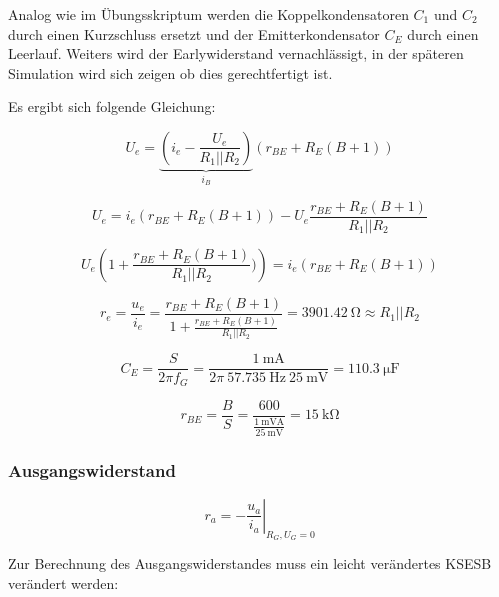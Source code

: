 Analog wie im Übungsskriptum werden die Koppelkondensatoren $C_1$ und $C_2$ durch einen Kurzschluss ersetzt und der Emitterkondensator $C_E$ durch einen Leerlauf. Weiters wird der Earlywiderstand vernachlässigt, in der späteren Simulation wird sich zeigen ob dies gerechtfertigt ist.

Es ergibt sich folgende Gleichung:

\begin{equation*}
    U_e = \underbrace{\left( i_e - \frac{U_e}{R_1 || R_2}\right)}_{i_B} \left( r_{BE} + R_E \left( B + 1\right) \right)
\end{equation*}

\begin{equation*}
    U_e = i_e \left( r_{BE} + R_E \left( B + 1\right) \right) - U_e \frac{r_{BE} + R_E \left( B + 1\right)}{R_1 || R_2}
\end{equation*}

\begin{equation*}
    U_e \left( 1 + \frac{r_{BE} + R_E \left( B + 1\right)}{R_1 || R_2}) \right)= i_e \left( r_{BE} + R_E \left( B + 1\right) \right)
\end{equation*}

\begin{equation*}
    r_e = \frac{u_e}{i_e} = \frac{r_{BE} + R_E \left( B + 1\right)}{ 1 + \frac{r_{BE} + R_E \left( B + 1\right)}{R_1 || R_2} }= \SI{3901.42}{\ohm} \approx R_1 || R_2
\end{equation*}

\begin{equation*}
    C_E = \frac{S}{2 \pi f_G} = \frac{\SI{1}{\milli \ampere}}{2 \pi \ \SI{57.735}{\hertz} \ \SI{25}{\milli \volt}} = \SI{110.3}{\micro \farad}
\end{equation*}

\begin{equation*}
   r_{BE} = \frac{B}{S} = \frac{600}{\frac{\SI{1}{\milli \volt\ampere}}{\SI{25}{\milli\volt}}} = \SI{15}{\kilo \ohm} 
\end{equation*}

\subsubsection{Ausgangswiderstand}

\begin{equation*}
    r_a = \left. - \frac{u_a}{i_a}\right|_{R_G, U_G = 0}
\end{equation*}

Zur Berechnung des Ausgangswiderstandes muss ein leicht verändertes KSESB verändert werden:

